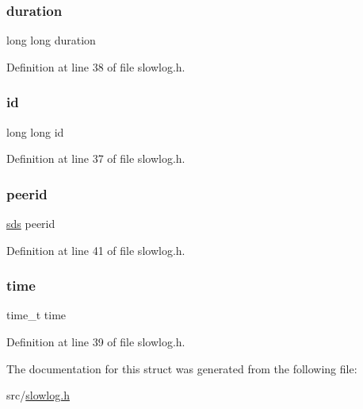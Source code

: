 \mbox{\label{structslowlog_entry_a09a525985f9f5a8746da229206f0e1db}} 
\subsubsection{\texorpdfstring{duration}{duration}}
{\footnotesize\ttfamily long long duration}



Definition at line 38 of file slowlog.\+h.

\mbox{\label{structslowlog_entry_ab87bfb64728d3251718dbf51ef534b60}} 
\subsubsection{\texorpdfstring{id}{id}}
{\footnotesize\ttfamily long long id}



Definition at line 37 of file slowlog.\+h.

\mbox{\label{structslowlog_entry_a1c0771287014c17317f1d2536fea4427}} 
\subsubsection{\texorpdfstring{peerid}{peerid}}
{\footnotesize\ttfamily \hyperlink{sds_8h_ad69abac3df4532879db9642c95f5ef6f}{sds} peerid}



Definition at line 41 of file slowlog.\+h.

\mbox{\label{structslowlog_entry_ab842bdb7d02be824fb48613032b4ff36}} 
\subsubsection{\texorpdfstring{time}{time}}
{\footnotesize\ttfamily time\+\_\+t time}



Definition at line 39 of file slowlog.\+h.



The documentation for this struct was generated from the following file\+:\begin{DoxyCompactItemize}
\item 
src/\hyperlink{slowlog_8h}{slowlog.\+h}\end{DoxyCompactItemize}
